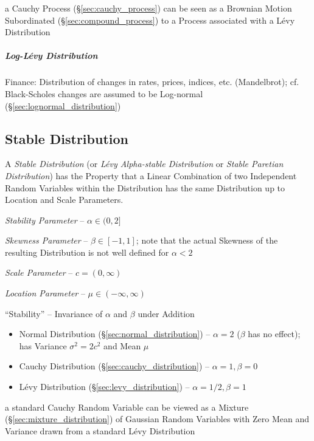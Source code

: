 a Cauchy Process (\S\ref{sec:cauchy_process}) can be seen as a Brownian Motion
Subordinated (\S\ref{sec:compound_process}) to a Process associated with a
L\'evy Distribution



\subparagraph{Log-L\'evy Distribution}\label{sec:log_levy}\hfill

Finance: Distribution of changes in rates, prices, indices, etc. (Mandelbrot);
cf. Black-Scholes changes are assumed to be Log-normal
(\S\ref{sec:lognormal_distribution})



\subsection{Stable Distribution}\label{sec:stable_distribution}

A \emph{Stable Distribution} (or \emph{L\'evy Alpha-stable Distribution} or
\emph{Stable Paretian Distribution}) has the Property that a Linear Combination
of two Independent Random Variables within the Distribution has the same
Distribution up to Location and Scale Parameters.

\emph{Stability Parameter} -- $\alpha \in (0, 2]$

\emph{Skewness Parameter} -- $\beta \in [-1, 1]$; note that the actual Skewness
of the resulting Distribution is not well defined for $\alpha < 2$

\emph{Scale Parameter} -- $c = (0, \infty)$

\emph{Location Parameter} -- $\mu \in (-\infty, \infty)$

``Stability'' -- Invariance of $\alpha$ and $\beta$ under Addition

\begin{itemize}
  \item Normal Distribution (\S\ref{sec:normal_distribution}) -- $\alpha = 2$
    ($\beta$ has no effect); has Variance $\sigma^2 = 2c^2$ and Mean $\mu$
  \item Cauchy Distribution (\S\ref{sec:cauchy_distribution}) --
    $\alpha = 1, \beta = 0$
  \item L\'evy Distribution (\S\ref{sec:levy_distribution}) --
    $\alpha = 1/2, \beta = 1$
\end{itemize}

a standard Cauchy Random Variable can be viewed as a Mixture
(\S\ref{sec:mixture_distribution}) of Gaussian Random Variables with Zero Mean
and Variance drawn from a standard L\'evy Distribution

